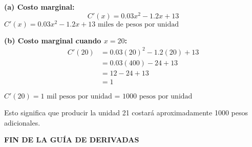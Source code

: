 \documentclass[12pt,a4paper]{article}
\begin{document}
\textbf{(a) Costo marginal:}
\[
C'(x) = 0.03x^2 - 1.2x + 13
\]
$\boxed{C'(x) = 0.03x^2 - 1.2x + 13 \text{ miles de pesos por unidad}}$

\bigskip

\textbf{(b) Costo marginal cuando $x = 20$:}
\begin{align*}
C'(20) &= 0.03(20)^2 - 1.2(20) + 13 \\
&= 0.03(400) - 24 + 13 \\
&= 12 - 24 + 13 \\
&= 1
\end{align*}

$\boxed{C'(20) = 1 \text{ mil pesos por unidad = 1000 pesos por unidad}}$

Esto significa que producir la unidad 21 costará aproximadamente 1000 pesos adicionales.

\bigskip
\bigskip

\begin{center}
	\textbf{FIN DE LA GUÍA DE DERIVADAS}
\end{center}
\end{document}
